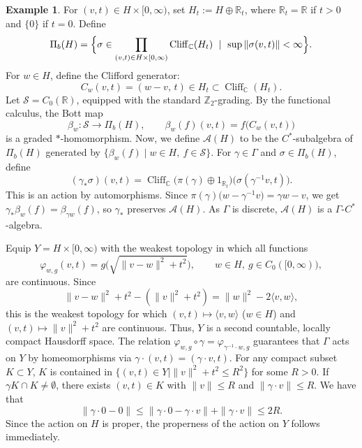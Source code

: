 \documentclass[pdflatex]{sn-jnl}
\theoremstyle{plain}
\theoremstyle{definition}
\newtheorem{example}[theorem]{Example}
\begin{document}
\begin{example}
For $(v,t)\in H\times[0,\infty)$, set $H_{t}:=H\oplus\mathbb{R}_{t}$, where $\mathbb{R}_{t}=\mathbb{R}$ if $t>0$ and $\{0\}$ if $t=0$. Define
\[
\Pi_b(H)=\Bigl\{\sigma\in\prod_{(v,t)\in H\times[0,\infty)}\operatorname{Cliff}_{\mathbb C}(H_t)\ \mid\ \sup\|\sigma(v,t)\|<\infty\Bigr\}.
\]
For $w\in H$, define the Clifford generator: $$C_{w}(v,t)=(w-v,\,t)\in H_{t}\subset\operatorname{Cliff}_{\mathbb C}(H_t).$$
Let $\mathcal{S}=C_0(\mathbb{R})$, equipped with the standard $\mathbb{Z}_{2}$-grading. By the functional calculus, the Bott map
\[
\beta_w\colon\mathcal S\to\Pi_b(H),\qquad \beta_w(f)(v,t)=f\bigl(C_w(v,t)\bigr)
\]
is a graded $*$-homomorphism. 
Now, we define $\mathcal{A}(H)$ to be the $C^{*}$-subalgebra of $\Pi_b(H)$ generated by $\{\beta_w(f)\mid w\in H,\ f\in\mathcal S\}$. 
For $\gamma\in\Gamma$ and $\sigma\in\Pi_b(H)$, define
\[
(\gamma_{*}\sigma)(v,t)=\operatorname{Cliff}_{\mathbb{C}}\bigl(\pi(\gamma)\oplus 1_{\mathbb R_{t}}\bigr)\bigl(\sigma(\gamma^{-1}v,t)\bigr).
\]
This is an action by automorphisms. Since $\pi(\gamma)\bigl(w-\gamma^{-1}v\bigr)=\gamma w-v$, we get $\gamma_{*}\beta_w(f)=\beta_{\gamma w}(f)$, so $\gamma_{*}$ preserves $\mathcal{A}(H)$. As $\Gamma$ is discrete, $\mathcal{A}(H)$ is a $\Gamma$-$C^{*}$-algebra.

Equip $Y=H\times[0,\infty)$ with the weakest topology in which all functions
\[
\varphi_{w,g}(v,t)=g\bigl(\sqrt{\|v-w\|^2+t^2}\bigr),\qquad w\in H,\ g\in C_0([0,\infty)),
\]
are continuous. Since
\[
\|v-w\|^2+t^2-(\|v\|^2+t^2)=\|w\|^2-2\langle v,w\rangle,
\]
this is the weakest topology for which $(v,t)\mapsto\langle v,w\rangle$ ($w\in H$) and $(v,t)\mapsto \|v\|^2+t^2$ are continuous. Thus, $Y$ is a second countable, locally compact Hausdorff space.
The relation $\varphi_{w,g}\circ\gamma=\varphi_{\gamma^{-1}\cdot w,g}$ guarantees that $\Gamma$ acts on $Y$ by homeomorphisms via $\gamma\cdot(v,t)=(\gamma\cdot v,t)$. For any compact subset $K\subset Y$, $K$ is contained in $\{(v,t)\in Y\mid\|v\|^2+t^2\le R^2\}$ for some $R>0$. If $\gamma K\cap K\neq\emptyset$, there exists $(v,t)\in K$ with $\|v\|\le R$ and $\|\gamma\cdot v\|\le R$. We have that
\[
\|\gamma\cdot 0-0\|\le\|\gamma\cdot 0-\gamma\cdot v\|+\|\gamma\cdot v\|\le 2R.
\]
Since the action on $H$ is proper, the properness of the action on $Y$ follows immediately.


\end{example}
\end{document}
